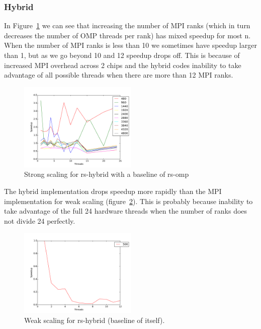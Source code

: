 \subsubsection{Hybrid}

In Figure~\ref{strong-rs-hybrid} we can see that increasing the number of MPI ranks (which in turn decreases the number of OMP threads per rank) has mixed speedup for most n. When the number of MPI ranks is less than 10 we sometimes have speedup larger than 1, but as we go beyond 10 and 12 speedup drops off. This is because of increased MPI overhead across 2 chips and the hybrid codes inability to take advantage of all possible threads when there are more than 12 MPI ranks.

\begin{figure}[ht]
\centering
\includegraphics[width=0.5\textwidth]{plots/strong_rs-hybrid_baseline-rs-omp--1.pdf}
\caption{Strong scaling for rs-hybrid with a baseline of rs-omp}
\label{strong-rs-hybrid}
\end{figure}

The hybrid implementation drops speedup more rapidly than the MPI implementation for weak scaling (figure~\ref{weak-rs-hybrid}). This is probably because inability to take advantage of the full 24 hardware threads when the number of ranks does not divide 24 perfectly.

\begin{figure}[ht]
\centering
\includegraphics[width=0.5\textwidth]{plots/weak_rs-hybrid.pdf}
\caption{Weak scaling for rs-hybrid (baseline of itself).}
\label{weak-rs-hybrid}
\end{figure}

